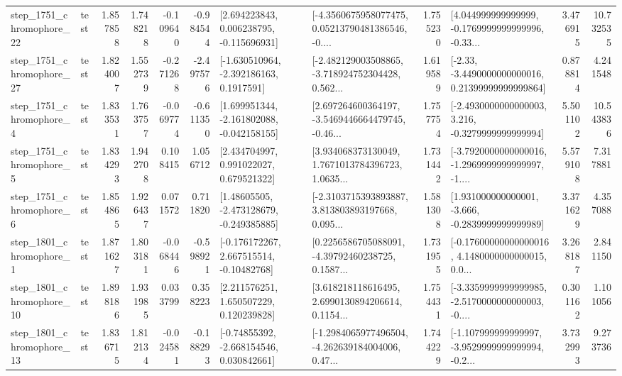 \begin{tabular}{llrrrrllrlrr}
 step\_1751\_chromophore\_22 &      test &      1.857858 &    1.748218 &     -0.109640 & -0.984544 &    [2.694223843, 0.006238795, -0.115696931] &  [-4.3560675958077475, 0.05213790481386546, -0.... &       1.755230 &  [4.044999999999999, -0.1769999999999996, -0.33... &            3.476915 &         10.732535 \\
 step\_1751\_chromophore\_27 &      test &      1.824007 &    1.552739 &     -0.271268 & -2.497576 &     [-1.630510964, -2.392186163, 0.1917591] &  [-2.482129003508865, -3.718924752304428, 0.562... &       1.619589 &  [-2.33, -3.4490000000000016, 0.21399999999999864] &            0.878814 &          4.241548 \\
  step\_1751\_chromophore\_4 &      test &      1.833531 &    1.763757 &     -0.069774 & -0.611350 &   [1.699951344, -2.161802088, -0.042158155] &  [2.697264600364197, -3.5469446664479745, -0.46... &       1.757754 &  [-2.4930000000000003, 3.216, -0.3279999999999994] &            5.501102 &         10.543836 \\
  step\_1751\_chromophore\_5 &      test &      1.834293 &    1.942708 &      0.108415 &  1.056712 &     [2.434704997, 0.991022027, 0.679521322] &  [3.934068373130049, 1.7671013784396723, 1.0635... &       1.731442 &  [-3.7920000000000016, -1.2969999999999997, -1.... &            5.579108 &          7.317881 \\
  step\_1751\_chromophore\_6 &      test &      1.854865 &    1.926437 &      0.071572 &  0.711820 &    [1.48605505, -2.473128679, -0.249385885] &  [-2.3103715393893887, 3.813803893197668, 0.095... &       1.581308 &   [1.931000000000001, -3.666, -0.2839999999999989] &            3.371629 &          4.357088 \\
  step\_1801\_chromophore\_1 &      test &      1.871627 &    1.803181 &     -0.068446 & -0.598921 &    [-0.176172267, 2.667515514, -0.10482768] &  [0.2256586705088091, -4.39792460238725, 0.1587... &       1.731955 &  [-0.17600000000000016, 4.1480000000000015, 0.0... &            3.268187 &          2.841150 \\
 step\_1801\_chromophore\_10 &      test &      1.898186 &    1.931985 &      0.033799 &  0.358223 &     [2.211576251, 1.650507229, 0.120239828] &  [3.618218118616495, 2.6990130894206614, 0.1154... &       1.754431 &  [-3.3359999999999985, -2.5170000000000003, -0.... &            0.301162 &          1.101056 \\
 step\_1801\_chromophore\_13 &      test &      1.836715 &    1.812134 &     -0.024581 & -0.188293 &    [-0.74855392, -2.668154546, 0.030842661] &  [-1.2984065977496504, -4.262639184004006, 0.47... &       1.744229 &  [-1.107999999999997, -3.9529999999999994, -0.2... &            3.732993 &          9.273736 \\

\end{tabular}
